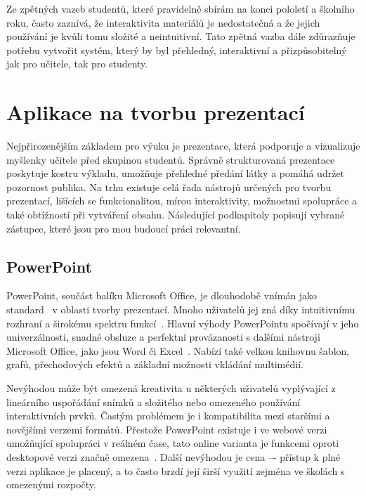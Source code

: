 Ze zpětných vazeb studentů, které pravidelně sbírám na konci pololetí a školního roku, často zaznívá, že interaktivita materiálů je nedostatečná a že jejich používání je kvůli tomu složité a neintuitivní.
Tato zpětná vazba dále zdůrazňuje potřebu vytvořit systém, který by byl přehledný, interaktivní a přizpůsobitelný jak pro učitele, tak pro studenty.



\section{Aplikace na tvorbu prezentací}

Nejpřirozenějším základem pro výuku je prezentace, která podporuje a vizualizuje myšlenky učitele před skupinou studentů.
Správně strukturovaná prezentace poskytuje kostru výkladu, umožňuje přehledné předání látky a pomáhá udržet pozornost publika.
Na trhu existuje celá řada nástrojů určených pro tvorbu prezentací, lišících se funkcionalitou, mírou interaktivity, možnostmi spolupráce a také obtížností při vytváření obsahu.
Následující podkapitoly popisují vybrané zástupce, které jsou pro mou budoucí práci relevantní.

\subsection{PowerPoint}

PowerPoint, součást balíku Microsoft Office, je dlouhodobě vnímán jako standard~\cite{pp_usage} v oblasti tvorby prezentací.
Mnoho uživatelů jej zná díky intuitivnímu rozhraní a širokému spektru funkcí~\cite{pp_usage}.
Hlavní výhody PowerPointu spočívají v jeho univerzálnosti, snadné obsluze a perfektní provázanosti s dalšími nástroji Microsoft Office, jako jsou Word či Excel~\cite{pp_excel, pp_word}.
Nabízí také velkou knihovnu šablon, grafů, přechodových efektů a základní možnosti vkládání multimédií.

Nevýhodou může být omezená kreativita u některých uživatelů vyplývající z lineárního uspořádání snímků a složitého nebo omezeného používání interaktivních prvků. 
Častým problémem je i kompatibilita mezi staršími a novějšími verzemi formátů.
Přestože PowerPoint existuje i ve webové verzi umožňující spolupráci v reálném čase, tato online varianta je funkcemi oproti desktopové verzi značně omezena~\cite{pp_platforms}.
Další nevýhodou je cena –- přístup k plné verzi aplikace je placený, a to často brzdí její širší využití zejména ve školách s omezenými rozpočty.


